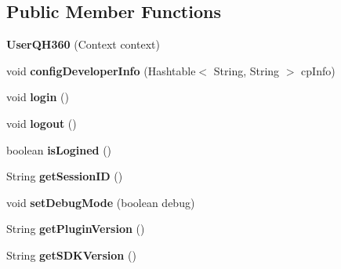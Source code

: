 \subsection*{Public Member Functions}
\begin{DoxyCompactItemize}
\item 
\mbox{\label{classorg_1_1cocos2dx_1_1plugin_1_1UserQH360_a2f8e5a122dfb7455683939e3eae4e6eb}} 
{\bfseries User\+Q\+H360} (Context context)
\item 
\mbox{\label{classorg_1_1cocos2dx_1_1plugin_1_1UserQH360_a0d0de80c1c445fda5f112976e60af685}} 
void {\bfseries config\+Developer\+Info} (Hashtable$<$ String, String $>$ cp\+Info)
\item 
\mbox{\label{classorg_1_1cocos2dx_1_1plugin_1_1UserQH360_a2776dc58effb1eba17c63c0631c14056}} 
void {\bfseries login} ()
\item 
\mbox{\label{classorg_1_1cocos2dx_1_1plugin_1_1UserQH360_aac42a9e33dab05d4fbe0785b3fd64e26}} 
void {\bfseries logout} ()
\item 
\mbox{\label{classorg_1_1cocos2dx_1_1plugin_1_1UserQH360_a0440eef531bcc03569331cefde55c803}} 
boolean {\bfseries is\+Logined} ()
\item 
\mbox{\label{classorg_1_1cocos2dx_1_1plugin_1_1UserQH360_a2757400d2ee28ef3da78ab1a1cd149be}} 
String {\bfseries get\+Session\+ID} ()
\item 
\mbox{\label{classorg_1_1cocos2dx_1_1plugin_1_1UserQH360_a2386541531191c8d85a404a0541d1f74}} 
void {\bfseries set\+Debug\+Mode} (boolean debug)
\item 
\mbox{\label{classorg_1_1cocos2dx_1_1plugin_1_1UserQH360_a3e0d94ffd1fe42cccef4fbf74bddcd9e}} 
String {\bfseries get\+Plugin\+Version} ()
\item 
\mbox{\label{classorg_1_1cocos2dx_1_1plugin_1_1UserQH360_ab59954cbc3e2a00adab798991385b7a9}} 
String {\bfseries get\+S\+D\+K\+Version} ()
\end{DoxyCompactItemize}

